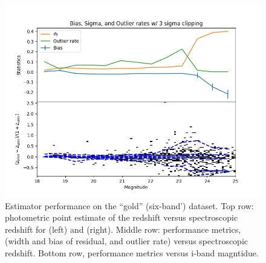 \begin{figure}
    \includegraphics[width=0.45\linewidth]{figures/biweight_stats_v_mag_bpz.png}    
    \caption{Estimator performance on the ``gold'' (six-band') dataset.  Top row: photometric point estimate of the redshift versus spectroscopic redshift for  (left) and  (right).   Middle row: performance metrics, (width and bias of residual, and outlier rate) versus spectroscopic redshift.    Bottom row, performance metrics versus i-band magntidue.}
    \label{fig:perf_gold}
\end{figure}

